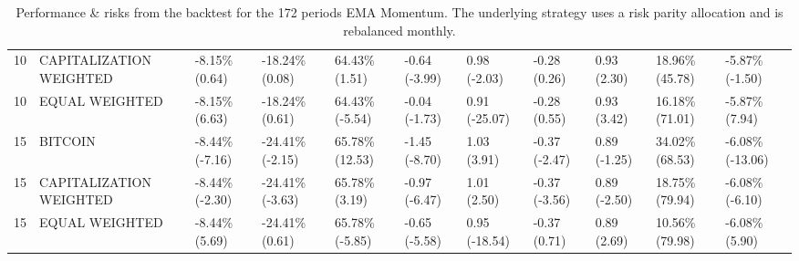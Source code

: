 \documentclass{article}
\begin{document}
\begin{landscape}
\begin{table}[H]
\begin{tabular}{p{0.4cm}|p{3cm}|p{1.65cm}|p{1.65cm}|p{1.65cm}|p{1.65cm}|p{1.65cm}|p{1.65cm}|p{1.65cm}|p{1.65cm}|p{1.65cm}}
10&CAPITALIZATION WEIGHTED&-8.15\% (0.64)&-18.24\% (0.08)&64.43\% (1.51)&-0.64 (-3.99)&0.98 (-2.03)&-0.28 (0.26)&0.93 (2.30)&18.96\% (45.78)&-5.87\% (-1.50)
\\ 
10&EQUAL WEIGHTED&-8.15\% (6.63)&-18.24\% (0.61)&64.43\% (-5.54)&-0.04 (-1.73)&0.91 (-25.07)&-0.28 (0.55)&0.93 (3.42)&16.18\% (71.01)&-5.87\% (7.94)
\\ 
15&BITCOIN&-8.44\% (-7.16)&-24.41\% (-2.15)&65.78\% (12.53)&-1.45 (-8.70)&1.03 (3.91)&-0.37 (-2.47)&0.89 (-1.25)&34.02\% (68.53)&-6.08\% (-13.06)
\\ 
15&CAPITALIZATION WEIGHTED&-8.44\% (-2.30)&-24.41\% (-3.63)&65.78\% (3.19)&-0.97 (-6.47)&1.01 (2.50)&-0.37 (-3.56)&0.89 (-2.50)&18.75\% (79.94)&-6.08\% (-6.10)
\\ 
15&EQUAL WEIGHTED&-8.44\% (5.69)&-24.41\% (0.61)&65.78\% (-5.85)&-0.65 (-5.58)&0.95 (-18.54)&-0.37 (0.71)&0.89 (2.69)&10.56\% (79.98)&-6.08\% (5.90)
\\ 
    \bottomrule
  \end{tabular}
  \label{tab:emamom172riskparity}
   \caption{Performance \& risks from the backtest for the 172 periods EMA Momentum. The underlying strategy uses a risk parity allocation and is rebalanced monthly.}
\end{table}
\end{landscape}
\end{document}
